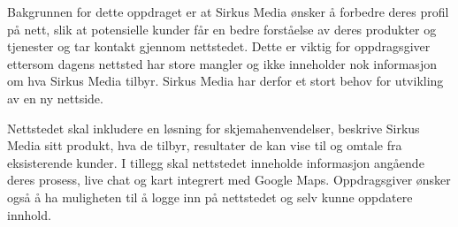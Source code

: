


Bakgrunnen for dette oppdraget er at Sirkus Media ønsker å forbedre deres profil på nett, slik at potensielle kunder får en bedre forståelse av deres produkter og tjenester og tar kontakt gjennom nettstedet. Dette er viktig for oppdragsgiver ettersom dagens nettsted har store mangler og ikke inneholder nok informasjon om hva Sirkus Media tilbyr. Sirkus Media har derfor et stort behov for utvikling av en ny nettside. 

Nettstedet skal inkludere en løsning for skjemahenvendelser, beskrive Sirkus Media sitt produkt, hva de tilbyr, resultater de kan vise til og omtale fra eksisterende kunder.
I tillegg skal nettstedet inneholde informasjon angående deres prosess, live chat og kart integrert med Google Maps. Oppdragsgiver ønsker også å ha muligheten til å logge inn på nettstedet og selv kunne oppdatere innhold.

